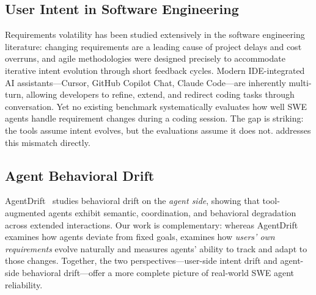 \subsection{User Intent in Software Engineering}
\label{sec:rw-intent}

Requirements volatility has been studied extensively in the software engineering literature: changing requirements are a leading cause of project delays and cost overruns, and agile methodologies were designed precisely to accommodate iterative intent evolution through short feedback cycles. Modern IDE-integrated AI assistants---Cursor, GitHub Copilot Chat, Claude Code---are inherently multi-turn, allowing developers to refine, extend, and redirect coding tasks through conversation. Yet no existing benchmark systematically evaluates how well SWE agents handle requirement changes during a coding session. The gap is striking: the tools assume intent evolves, but the evaluations assume it does not. \bench{} addresses this mismatch directly.

\subsection{Agent Behavioral Drift}
\label{sec:rw-agentdrift}

AgentDrift~\citep{agentdrift2026} studies behavioral drift on the \emph{agent side}, showing that tool-augmented agents exhibit semantic, coordination, and behavioral degradation across extended interactions. Our work is complementary: whereas AgentDrift examines how agents deviate from fixed goals, \drift{} examines how \emph{users' own requirements} evolve naturally and measures agents' ability to track and adapt to those changes. Together, the two perspectives---user-side intent drift and agent-side behavioral drift---offer a more complete picture of real-world SWE agent reliability.
